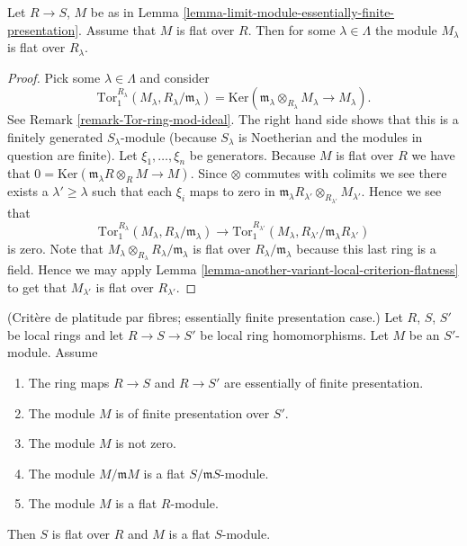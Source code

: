 \begin{lemma}
\label{lemma-colimit-eventually-flat}
Let $R \to S$, $M$ be as in
Lemma \ref{lemma-limit-module-essentially-finite-presentation}.
Assume that $M$ is flat over $R$.
Then for some $\lambda \in \Lambda$ the module
$M_\lambda$ is flat over $R_\lambda$.
\end{lemma}

\begin{proof}
Pick some $\lambda \in \Lambda$ and consider
$$
\text{Tor}_1^{R_\lambda}(M_\lambda, R_\lambda/\mathfrak m_\lambda)
=
\text{Ker}(\mathfrak m_\lambda \otimes_{R_\lambda} M_\lambda
\to M_\lambda).
$$
See Remark \ref{remark-Tor-ring-mod-ideal}. The right hand side
shows that this is a finitely generated $S_\lambda$-module (because
$S_\lambda$ is Noetherian and the modules in question are finite).
Let $\xi_1,\ldots,\xi_n$ be generators.
Because $M$ is flat over $R$ we
have that $0 = \text{Ker}(\mathfrak m_\lambda R \otimes_R M \to M)$.
Since $\otimes$ commutes with colimits we see there exists
a $\lambda' \geq \lambda$ such that each $\xi_i$ maps to
zero in
$\mathfrak m_{\lambda}R_{\lambda'} \otimes_{R_{\lambda'}} M_{\lambda'}$.
Hence we see that
$$
\text{Tor}_1^{R_\lambda}(M_\lambda, R_\lambda/\mathfrak m_\lambda)
\longrightarrow
\text{Tor}_1^{R_{\lambda'}}(M_\lambda,
R_{\lambda'}/\mathfrak m_{\lambda}R_{\lambda'})
$$
is zero. Note that
$M_\lambda \otimes_{R_\lambda} R_\lambda/\mathfrak m_\lambda$
is flat over $R_\lambda/\mathfrak m_\lambda$ because this last
ring is a field. Hence we may apply Lemma
\ref{lemma-another-variant-local-criterion-flatness}
to get that $M_{\lambda'}$ is flat over $R_{\lambda'}$.
\end{proof}

\begin{lemma}
\label{lemma-criterion-flatness-fibre}
(Crit\`ere de platitude par fibres; essentially finite presentation case.)
Let $R$, $S$, $S'$ be local rings and let $R \to S \to S'$ be local ring
homomorphisms. Let $M$ be an $S'$-module. Assume
\begin{enumerate}
\item The ring maps $R \to S$ and $R \to S'$ are essentially
of finite presentation.
\item The module $M$ is of finite presentation over $S'$.
\item The module $M$ is not zero.
\item The module $M/\mathfrak mM$ is a flat $S/\mathfrak mS$-module.
\item The module $M$ is a flat $R$-module.
\end{enumerate}
Then $S$ is flat over $R$ and $M$ is a flat $S$-module.
\end{lemma}

